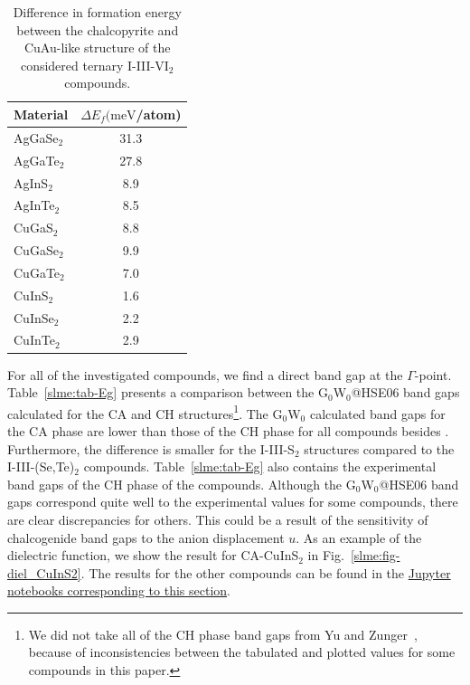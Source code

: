 \begin{refsection}
\begin{table}[ht] 
\centering 
\captionsetup{width=0.8\textwidth}
\renewcommand{\arraystretch}{1.2} 
\caption{\label{slme:tab-formation} Difference in formation energy between the 
chalcopyrite and CuAu-like structure of the considered ternary I-III-VI$_2$ 
compounds.} 
\begin{tabular}{l@{ em}S[table-format=1.1]} 
Material & {$\Delta E_f(\si{\milli\electronvolt}$/atom)} \\\hline 
AgGaSe$_2$ & 31.3 \\ 
AgGaTe$_2$ & 27.8 \\ 
AgInS$_2$ & 8.9 \\ 
AgInTe$_2$ & 8.5 \\ 
CuGaS$_2$ & 8.8 \\ 
CuGaSe$_2$ & 9.9 \\ 
CuGaTe$_2$ & 7.0 \\ 
CuInS$_2$ & 1.6 \\ 
CuInSe$_2$ & 2.2 \\ 
CuInTe$_2$ & 2.9 \\ \hline 
\end{tabular} 
\end{table} 

 
For all of the investigated compounds, we find a direct band gap at the 
$\Gamma$-point. Table~\ref{slme:tab-Eg} presents a comparison between the 
G$_0$W$_0$@HSE06 band gaps calculated for the CA and CH 
structures\footnote[4]{We did not take all of the CH phase band gaps from Yu 
and Zunger~\cite{Yu2012}, because of inconsistencies between the tabulated and 
plotted values for some compounds in this paper.}. The 
G$_0$W$_0$ calculated band gaps for the CA phase are lower than those of the 
CH phase for all compounds besides . Furthermore, the difference is 
smaller for the \mbox{I-III-S$_2$} structures compared to the 
\mbox{I-III-(Se,Te)$_2$} compounds. Table~\ref{slme:tab-Eg} also contains the 
experimental band gaps of the CH phase of the compounds.  
Although the G$_0$W$_0$@HSE06 band gaps correspond quite well to the 
experimental values for some compounds, there are clear discrepancies for 
others. This could be a result of the sensitivity of chalcogenide band gaps to 
the anion displacement $u$. As an example of the dielectric function, we show 
the result for \mbox{CA-CuInS$_2$} in Fig.~\ref{slme:fig-diel_CuInS2}. The 
results for the other compounds can be found in the 
\href{https://github.com/mbercx/phd-thesis/tree/master/jupyter/slme\#absorber-layer-efficiency}{Jupyter notebooks corresponding to this section}. 
 

\end{refsection}
